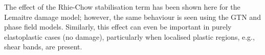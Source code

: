 \documentclass[sn-mathphys,Numbered]{sn-jnl}%
\begin{document}
The effect of the Rhie-Chow stabilisation term has been shown here for the Lemaitre damage model; however, the same behaviour is seen using the GTN and phase field models.
Similarly, this effect can even be important in purely elastoplastic cases (no damage), particularly when localised plastic regions, e.g., shear bands, are present.



\end{document}
